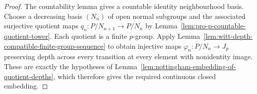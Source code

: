 \begin{proof}
The countability lemma gives a countable identity neighbourhood
basis. Choose a decreasing basis $(N_n)$ of open normal subgroups
and the associated surjective quotient maps
$q_n:P/N_{n+1}\to P/N_n$ by
Lemma~\ref{lem:pro-p-countable-quotient-tower}.
Each quotient is a finite $p$-group. Apply
Lemma~\ref{lem:witt-depth-compatible-finite-group-sequence}
to obtain injective maps $\varphi_n:P/N_n\to J_p$ preserving
depth across every transition at every element with nonidentity
image. These are exactly the hypotheses of
Lemma~\ref{lem:nottingham-embedding-of-quotient-depths}, which
therefore gives the required continuous closed embedding.
\end{proof}
